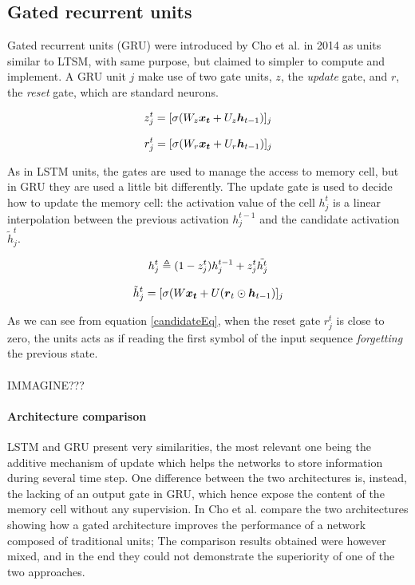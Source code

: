  
\subsection{Gated recurrent units}

Gated recurrent units (GRU) were introduced by Cho et al. in 2014 \cite{gru} as units similar to LTSM, with same purpose, 
but claimed to simpler to compute and implement. A GRU unit $j$ make use of two gate units, $z$, the 
\textit{update} gate, and $r$, the \textit{reset} gate, which are standard neurons.

\begin{equation}
 z_j^t = [\sigma(W_z\boldsymbol{x_t} + U_z\boldsymbol{h}_{t-1})]_j
\end{equation}

\begin{equation}
 r_j^t = [\sigma(W_r\boldsymbol{x_t} + U_r\boldsymbol{h}_{t-1})]_j
\end{equation}

As in LSTM units, the gates are used to manage the access to memory cell, but in GRU they are used a little bit 
differently. The update gate is used to decide how to update the memory cell: the activation value of the cell 
$h_j^{t}$ is a linear interpolation between the previous activation $h_j^{t-1}$ and the candidate activation 
$\tilde{h}_j^t$.

\begin{equation}
 h_j^t \triangleq (1-z_j^t)h_j^{t-1} + z_j^t\tilde{h^t_j}
\end{equation}

\begin{equation}
 \tilde{h}_j^t = [\sigma(W\boldsymbol{x_t} + U(\boldsymbol{r}_t \odot \boldsymbol{h}_{t-1})]_j
 \label{candidateEq}
\end{equation}

As we can see from equation \ref{candidateEq}, when the reset gate $r_j^t$ is close to zero, the units acts as if 
reading the first symbol of the input sequence \textit{forgetting} the previous state.
\\\\
IMMAGINE???

\paragraph{Architecture comparison}
LSTM and GRU present very similarities, the most relevant one being the additive mechanism of update which helps the 
networks to store information during several time step. One difference between the two architectures is, instead, the 
lacking of an output gate in GRU, which hence expose the content of the memory cell without any supervision. In 
\cite{gru_lstm_empirical} Cho et al. compare the two architectures showing how a gated architecture improves the 
performance of a network composed of traditional units; The comparison results obtained were however mixed, and in the 
end they could not demonstrate the superiority of one of the two approaches.


